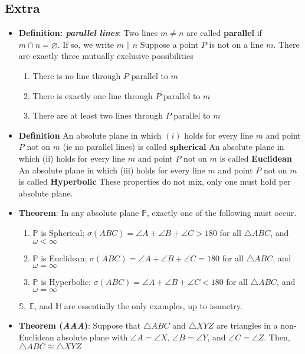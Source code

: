 \documentclass{report}
\begin{document}
    \subsection{Extra}
    \begin{itemize}
        \item \textbf{Definition: \textit{parallel lines}}: Two lines $m\ne n$ are called \textbf{parallel} if $m \cap n = \varnothing$. If so, we write $m \parallel n $
            \bigbreak \noindent 
            Suppose a point $P$ is not on a line $m$. There are exactly three mutually exclusive possibilities
            \begin{enumerate}[label=(\roman*)]
                \item There is no line through $P$ parallel to $m$ 
                \item There is exactly one line through $P$ parallel to $m$
                \item There are at least two lines through $P$ parallel to $m$
            \end{enumerate}
        \item \textbf{Definition} An absolute plane in which $(i)$ holds for every line $m$ and point $P$ not on $m$ (ie no parallel lines) is called \textbf{spherical}
            \bigbreak \noindent 
            An absolute plane in which (ii) holds for every line $m$ and point $P$ not on $m$ is called \textbf{Euclidean}
            \bigbreak \noindent 
            An absolute plane in which (iii) holds for every line $m$ and point $P$ not on $m$ is called \textbf{Hyperbolic}
            \bigbreak \noindent 
            These properties do not mix, only one must hold per absolute plane. 
        \item \textbf{Theorem}: In any absolute plane $\mathbb{P}$, exactly one of the following must occur.
            \begin{enumerate}[label=(\roman*)]
                \item $\mathbb{P}$ is Spherical; $\sigma(ABC) = \angle A + \angle B + \angle C > 180$ for all $\triangle ABC$, and $\omega < \infty $ 
                \item $\mathbb{P}$ is Euclidean; $\sigma(ABC) = \angle A + \angle B + \angle C = 180$ for all $\triangle ABC$, and $\omega = \infty $ 
                \item $\mathbb{P}$ is Hyperbolic; $\sigma(ABC) = \angle A + \angle B + \angle C < 180$ for all $\triangle ABC$, and $\omega = \infty $ 
            \end{enumerate}
            \bigbreak \noindent 
            $\mathbb{S},\ \mathbb{E}$, and $\mathbb{H} $ are essentially the only examples, up to isometry.
        \item \textbf{Theorem (\textit{AAA})}: Suppose that $\triangle ABC$ and $\triangle XYZ$ are triangles in a non-Euclidean absolute plane with $\angle A = \angle X$, $ \angle B = \angle Y$, and $ \angle C = \angle Z$. Then, $\triangle ABC \cong \triangle XYZ$
    \end{itemize}
\end{document}
